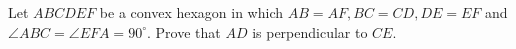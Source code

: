 Let $ABCDEF$ be a convex hexagon in which $AB=AF, BC=CD, DE=EF$ and $\angle ABC = \angle EFA = 90^{\circ}$. Prove that $AD$ is perpendicular to $CE$.